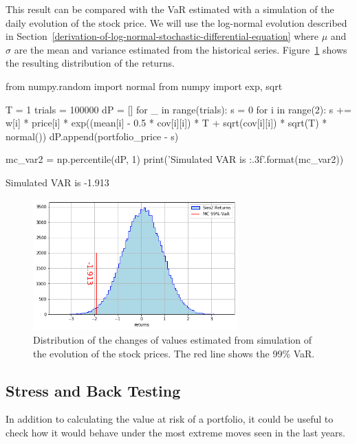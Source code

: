 This result can be compared with the VaR estimated with a simulation of the daily evolution of the stock price. We will use the log-normal evolution described in Section~\ref{derivation-of-log-normal-stochastic-differential-equation} where $\mu$ and $\sigma$ are the mean and variance estimated from the historical series. Figure~\ref{fig:mc2_var} shows the resulting distribution of the returns.

\begin{ipython}
from numpy.random import normal
from numpy import exp, sqrt

T = 1
trials = 100000
dP = []
for _ in range(trials):
    s = 0
    for i in range(2):
        s += w[i] * price[i] * exp((mean[i] - 0.5 * cov[i][i]) * T +
             sqrt(cov[i][i]) * sqrt(T) * normal())
        dP.append(portfolio_price - s)

mc_var2 = np.percentile(dP, 1)
print('Simulated VAR is {:.3f}'.format(mc_var2))
\end{ipython}
\begin{ioutput}
Simulated VAR is -1.913
\end{ioutput}

\begin{figure}[htb]
	\centering
	\includegraphics[width=0.7\textwidth]{figures/sim2_var}
	\caption{Distribution of the changes of values estimated from simulation of the evolution of the stock prices. The red line shows the 99\% VaR.}
	\label{fig:mc2_var}
\end{figure}

\subsection{Stress and Back Testing}
\label{stress-testing-and-back-testing}

In addition to calculating the value at risk of a portfolio, it could be useful to 
check how it would behave under the most extreme moves seen in the last years.

